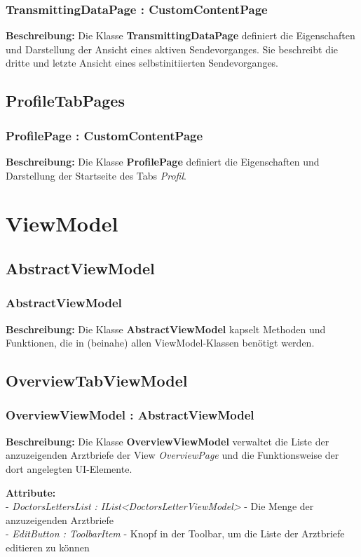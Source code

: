 \documentclass[a4paper]{scrreprt}
\begin{document}
\subsubsection{TransmittingDataPage : CustomContentPage}
\textbf{Beschreibung:} Die Klasse \textbf{TransmittingDataPage} definiert die Eigenschaften und Darstellung der Ansicht eines aktiven Sendevorganges. Sie beschreibt die dritte und letzte Ansicht eines selbstinitiierten Sendevorganges. 

\subsection{ProfileTabPages}
\subsubsection{ProfilePage : CustomContentPage}
\textbf{Beschreibung:} Die Klasse \textbf{ProfilePage} definiert die Eigenschaften und Darstellung der Startseite des Tabs \textit{Profil}.


\section{ViewModel}

\subsection{AbstractViewModel}
\subsubsection{AbstractViewModel}
\textbf{Beschreibung:} Die Klasse \textbf{AbstractViewModel} kapselt Methoden und Funktionen, die in (beinahe) allen ViewModel-Klassen benötigt werden.

\subsection{OverviewTabViewModel}
\subsubsection{OverviewViewModel : AbstractViewModel}
\textbf{Beschreibung:} Die Klasse \textbf{OverviewViewModel} verwaltet die Liste der anzuzeigenden Arztbriefe der View \textit{OverviewPage} und die Funktionsweise der dort angelegten UI-Elemente.

\textbf{Attribute:}\\
- \textit{DoctorsLettersList : IList<DoctorsLetterViewModel>} - Die Menge der anzuzeigenden Arztbriefe\\
- \textit{EditButton : ToolbarItem} - Knopf in der Toolbar, um die Liste der Arztbriefe editieren zu können\\
\end{document}
